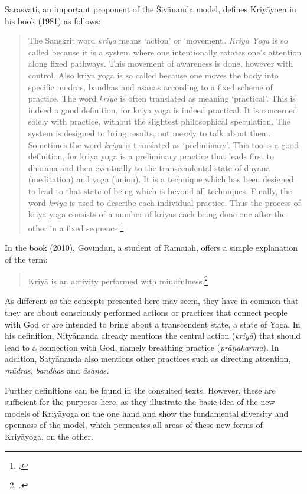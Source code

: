 \citeauthor{kriyayogasarasvati1981} Sarasvati, an important proponent of the Śivānanda model, defines Kriyāyoga in his book  (1981) as follows: \begin{quote} The Sanskrit word \textit{kriya} means `action' or `movement'. \textit{Kriya Yoga} is so called because it is a system where one intentionally rotates one's attention along fixed pathways. This movement of awareness is done, however with control. Also kriya yoga is so called because one moves the body into specific mudras, bandhas and asanas according to a fixed scheme of practice. The word \textit{kriya} is often translated as meaning `practical'. This is indeed a good definition, for kriya yoga is indeed practical. It is concerned solely with practice, without the slightest philosophical speculation. The system is designed to bring results, not merely to talk about them. Sometimes the word \textit{kriya} is translated as `preliminary'. This too is a good definition, for kriya yoga is a preliminary practice that leads first to dharana and then eventually to the transcendental state of dhyana (meditation) and yoga (union). It is a technique which has been designed to lead to that state of being which is beyond all techniques. Finally, the word \textit{kriya} is used to describe each individual practice. Thus the process of kriya yoga consists of a number of kriyas each being done one after the other in a fixed sequence.\footnote{\citeauthor[1981: 699]{kriyayogasarasvati1981}.}\end{quote}
In the book  (2010), Govindan, a student of Ramaiah, offers a simple explanation of the term: \begin{quote} Kriyā is an activity performed with mindfulness.\footnote{\citeauthor[2010: 214]{govindan2010}.}\end{quote}

As different as the concepts presented here may seem, they have in common that they are about consciously performed actions or practices that connect people with God or are intended to bring about a transcendent state, a state of Yoga. In his definition, Nityānanda already mentions the central action (\textit{kriyā}) that should lead to a connection with God, namely breathing practice (\textit{prāṇakarma}). In addition, Satyānanda also mentions other practices such as directing attention, \textit{mūdra}s, \textit{bandha}s and \textit{āsana}s.  

Further definitions can be found in the consulted texts. However, these are sufficient for the purposes here, as they illustrate the basic idea of the new models of Kriyāyoga on the one hand and show the fundamental diversity and openness of the model, which permeates all areas of these new forms of Kriyāyoga, on the other.  

